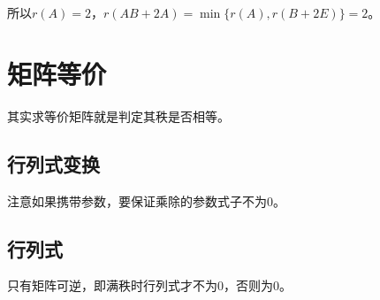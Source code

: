 \documentclass[UTF8, 12pt]{ctexart}
\begin{document}
所以$r(A)=2$，$r(AB+2A)=\min\{r(A),r(B+2E)\}=2$。

\section{矩阵等价}

其实求等价矩阵就是判定其秩是否相等。

\subsection{行列式变换}

注意如果携带参数，要保证乘除的参数式子不为0。

\subsection{行列式}

只有矩阵可逆，即满秩时行列式才不为0，否则为0。
\end{document}
